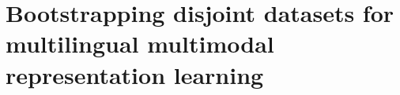 %
%










\chapter{Bootstrapping disjoint datasets for multilingual multimodal representation learning}
\label{ch:EMNLP}
%

